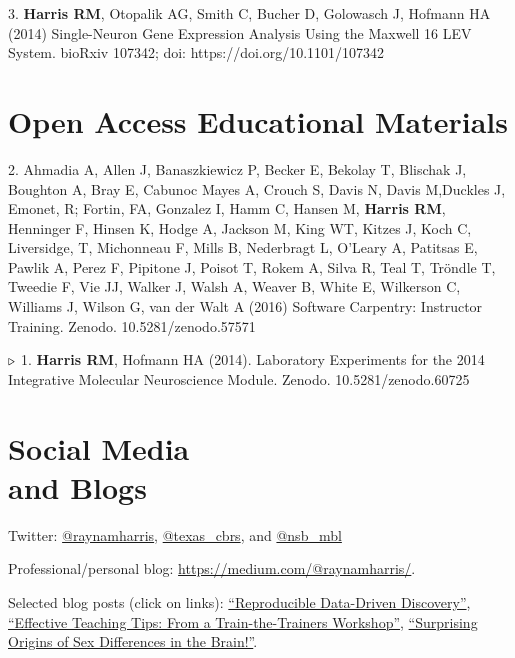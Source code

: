 \documentclass[margin,line]{resume}
\begin{document}
\begin{resume}
3. {\bf Harris RM}, Otopalik AG, Smith C, Bucher D, Golowasch J, Hofmann HA (2014) Single-Neuron Gene Expression Analysis Using the Maxwell 16 LEV System. bioRxiv 107342; doi: https://doi.org/10.1101/107342

\section{\mysidestyle Open Access Educational Materials}

2. Ahmadia A, Allen J, Banaszkiewicz P, Becker E, Bekolay T, Blischak J, Boughton A, Bray E, Cabunoc Mayes A, Crouch S, Davis N, Davis M,Duckles J, Emonet, R; Fortin, FA, Gonzalez I, Hamm C, Hansen M, {\bf Harris RM}, Henninger F, Hinsen K, Hodge A, Jackson M, King WT, Kitzes J, Koch C, Liversidge, T, Michonneau F, Mills B, Nederbragt L, O'Leary A, Patitsas E, Pawlik A, Perez F, Pipitone J, Poisot T, Rokem A, Silva R, Teal T, Tröndle T, Tweedie F, Vie JJ, Walker J, Walsh A, Weaver B, White E, Wilkerson C, Williams J, Wilson G, van der Walt A (2016) Software Carpentry: Instructor Training. Zenodo. 10.5281/zenodo.57571 

{\color{red} ${\bf \triangleright}$}
1. 	{\bf Harris RM}, Hofmann HA (2014). Laboratory Experiments for the 2014 Integrative Molecular Neuroscience Module. Zenodo. 10.5281/zenodo.60725 


\section{\mysidestyle Social Media\\and Blogs}

Twitter: \href{http://twitter.com/raynamharris}{@raynamharris}, \href{http://twitter.com/texas\_cbrs}{@texas\_cbrs}, and \href{http://twitter.com/nsb\_mbl}{@nsb\_mbl} 

Professional/personal blog: \url{https://medium.com/@raynamharris/}.  

Selected blog posts (click on links): \href{https://medium.com/@raynamharris/reproducible-data-driven-discovery-decbf1de2f46#.c63q0cget}{``Reproducible Data-Driven Discovery''}, \href{http://blogs.plos.org/neuro/2015/02/12/effective-teaching-tips-from-a-train-the-trainers-workshop/}{``Effective Teaching Tips: From a Train-the-Trainers Workshop''}, \href{http://blogs.plos.org/neuro/2014/12/18/plos-sfn14-highlights-surprising-origins-of-sex-differences-in-the-brain/}{``Surprising Origins of Sex Differences in the Brain!''}.


\end{resume}
\end{document}
